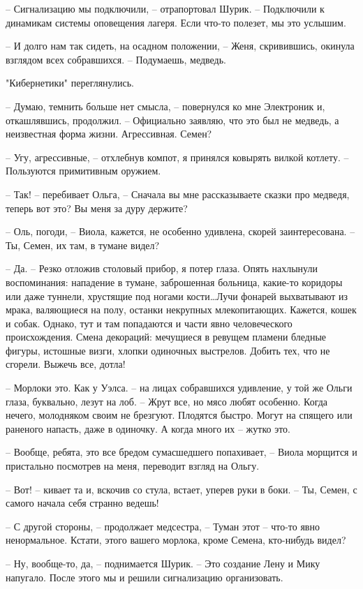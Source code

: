 \documentclass[a4paper]{book}
\begin{document}
-- Сигнализацию мы подключили, -- отрапортовал Шурик. -- Подключили к динамикам системы оповещения лагеря. Если что-то полезет, мы это услышим.

-- И долго нам так сидеть, на осадном положении, -- Женя, скривившись, окинула взглядом всех собравшихся. -- Подумаешь, медведь. 

"Кибернетики" переглянулись. 

-- Думаю, темнить больше нет смысла, -- повернулся ко мне Электроник и, откашлявшись, продолжил. -- Официально заявляю, что это был не медведь, а неизвестная форма жизни. Агрессивная. Семен?

-- Угу, агрессивные, -- отхлебнув компот, я принялся ковырять вилкой котлету. -- Пользуются примитивным оружием.

-- Так! -- перебивает Ольга, -- Сначала вы мне рассказываете сказки про медведя, теперь вот это? Вы меня за дуру держите?

-- Оль, погоди, -- Виола, кажется, не особенно удивлена, скорей заинтересована. -- Ты, Семен, их там, в тумане видел?

-- Да. -- Резко отложив столовый прибор, я потер глаза. Опять нахлынули воспоминания: нападение в тумане, заброшенная больница, какие-то коридоры или даже туннели, хрустящие под ногами кости\ldots Лучи фонарей выхватывают из мрака, валяющиеся на полу, останки некрупных млекопитающих. Кажется, кошек и собак. Однако, тут и там попадаются и части явно человеческого происхождения. Смена декораций: мечущиеся в ревущем пламени бледные фигуры, истошные визги, хлопки одиночных выстрелов. Добить тех, что не сгорели. Выжечь все, дотла!

-- Морлоки это. Как у Уэлса. -- на лицах собравшихся удивление, у той же Ольги глаза, буквально, лезут на лоб. -- Жрут все, но мясо любят особенно. Когда нечего, молодняком своим не брезгуют. Плодятся быстро. Могут на спящего или раненого напасть, даже в одиночку. А когда много их -- жутко это.

-- Вообще, ребята, это все бредом сумасшедшего попахивает, -- Виола морщится и пристально посмотрев на меня, переводит взгляд на Ольгу.

-- Вот! -- кивает та и, вскочив со стула, встает, уперев руки в боки. -- Ты, Семен, с самого начала себя странно ведешь!

-- С другой стороны, -- продолжает медсестра, -- Туман этот -- что-то явно ненормальное. Кстати, этого вашего морлока, кроме Семена, кто-нибудь видел?

-- Ну, вообще-то, да, -- поднимается Шурик. -- Это создание Лену и Мику напугало. После этого мы и решили сигнализацию организовать.
\end{document}
